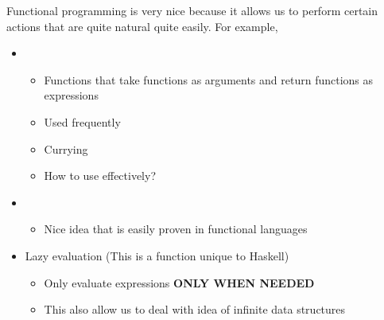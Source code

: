 Functional programming is very nice because it allows us to perform certain actions that are quite natural quite easily.
For example,
\begin{itemize}[noitemsep]
\item {}
  \begin{itemize}[noitemsep]
  \item Functions that take functions as arguments and return functions as expressions
  \item Used frequently
  \item Currying
  \item How to use effectively?
  \end{itemize}

\item {}
  \begin{itemize}[noitemsep]
  \item Nice idea that is easily proven in functional languages
  \end{itemize}

\item Lazy evaluation (This is a function unique to Haskell)
  \begin{itemize}[noitemsep]
  \item Only evaluate expressions \textbf{ONLY WHEN NEEDED}
  \item This also allow us to deal with idea of infinite data structures
  \end{itemize}
\end{itemize}





